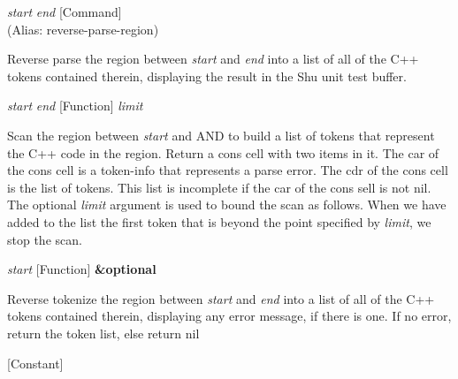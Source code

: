 \vspace{1em}
\noindent
{}
\usebox{\funcname}\emph{start} \emph{end}
 \hfill [Command]\\%
 (Alias: reverse-parse-region)

\begin{doc-string}
Reverse parse the region between \emph{start} and \emph{end} into a list of all of the C++
tokens contained therein, displaying the result in the Shu unit test buffer.
\end{doc-string}

\vspace{1em}
\noindent
{}
\usebox{\funcname}\emph{start} \emph{end}
 \hfill [Function]
\hspace*{\wd\funcname}\emph{limit}

\begin{doc-string}
Scan the region between \emph{start} and AND to build a list of tokens that represent the C++
code in the region.  Return a cons cell with two items in it.  The car of the cons cell
is a token-info that represents a parse error.  The cdr of the cons cell is the list of
tokens.  This list is incomplete if the car of the cons sell is not nil.  The optional
\emph{limit} argument is used to bound the scan as follows.  When we have added to the list the
first token that is beyond the point specified by \emph{limit}, we stop the scan.
\end{doc-string}

\vspace{1em}
\noindent
{}
\usebox{\funcname}\emph{start}
 \hfill [Function]
\hspace*{\wd\funcname}\textbf{\&optional}
\hspace*{\wd\funcname}

\begin{doc-string}
Reverse tokenize the region between \emph{start} and \emph{end} into a list of all of the C++
tokens contained therein, displaying any error message, if there is one.  If no
error, return the token list, else return nil
\end{doc-string}

\vspace{1em}
\noindent
{}
\usebox{\funcname}
 \hfill [Constant]

